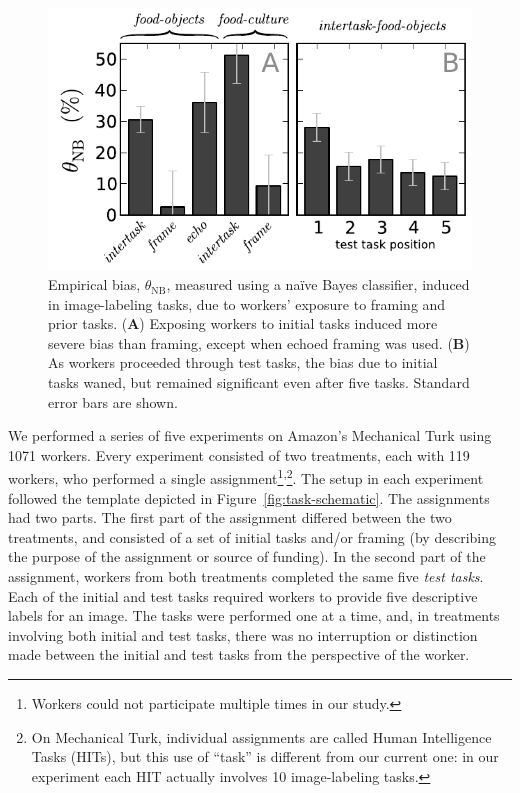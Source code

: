 \documentclass{sigchi}
\begin{document}
\begin{figure}[t]
	\includegraphics[scale=0.75]{figs/theta.pdf}
	\caption{
		Empirical bias, $\theta_\mathrm{NB}$, measured using a na\"ive Bayes 
		classifier, induced in image-labeling tasks, due to workers' 
		exposure to framing and prior tasks.  
		(\textbf{A}) Exposing workers to initial tasks induced more severe
		bias than framing, except when echoed framing was used. 
		(\textbf{B}) As workers proceeded through test tasks, 
		the bias due to initial tasks waned, 
		but remained significant even after five tasks.  
		Standard error bars are shown.
	}
	\label{fig:theta}
\end{figure}



We performed a series of five experiments
on Amazon's Mechanical Turk using 1071 workers.  
Every experiment consisted of two treatments, each with 119 workers,
who performed a single assignment\footnote{Workers could not participate 
multiple times in our study.}\textsuperscript{,}\footnote{On Mechanical Turk, individual 
assignments are called Human Intelligence Tasks (HITs), but this use of 
``task'' is 
different from our current one: in our experiment each HIT actually 
involves 10 image-labeling tasks.}.  
The setup in each experiment followed the template depicted in 
Figure~\ref{fig:task-schematic}.  
The assignments had two parts.  The first part of the assignment differed
between the two treatments, and consisted of a set of initial tasks 
and/or framing (by describing the purpose of the assignment or source of 
funding).  In the second part of the assignment, workers from both
treatments completed the same five \textit{test tasks}.  Each of the 
initial and test tasks required workers to provide five descriptive labels
for an image.  The tasks were performed one at a time,
and, in treatments involving both initial and test tasks, there was no
interruption or distinction made between the initial and test tasks from
the perspective of the worker.
\end{document}
